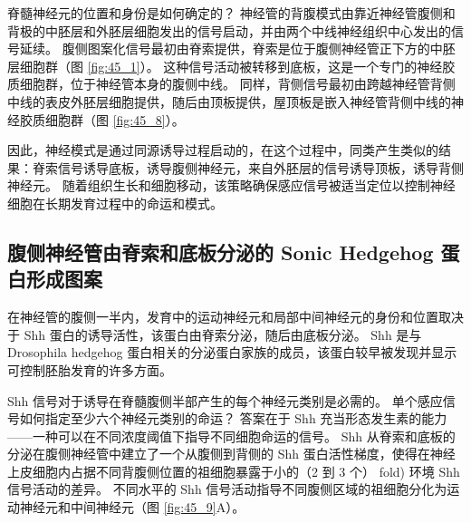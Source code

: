 脊髓神经元的位置和身份是如何确定的？ 神经管的背腹模式由靠近神经管腹侧和背极的中胚层和外胚层细胞发出的信号启动，并由两个中线神经组织中心发出的信号延续。 腹侧图案化信号最初由脊索提供，脊索是位于腹侧神经管正下方的中胚层细胞群（图 \ref{fig:45_1}）。 这种信号活动被转移到底板，这是一个专门的神经胶质细胞群，位于神经管本身的腹侧中线。 同样，背侧信号最初由跨越神经管背侧中线的表皮外胚层细胞提供，随后由顶板提供，屋顶板是嵌入神经管背侧中线的神经胶质细胞群（图 \ref{fig:45_8}）。

因此，神经模式是通过同源诱导过程启动的，在这个过程中，同类产生类似的结果：脊索信号诱导底板，诱导腹侧神经元，来自外胚层的信号诱导顶板，诱导背侧神经元。 随着组织生长和细胞移动，该策略确保感应信号被适当定位以控制神经细胞在长期发育过程中的命运和模式。

\subsection{腹侧神经管由脊索和底板分泌的 Sonic Hedgehog 蛋白形成图案}
在神经管的腹侧一半内，发育中的运动神经元和局部中间神经元的身份和位置取决于 Shh 蛋白的诱导活性，该蛋白由脊索分泌，随后由底板分泌。 Shh 是与 Drosophila hedgehog 蛋白相关的分泌蛋白家族的成员，该蛋白较早被发现并显示可控制胚胎发育的许多方面。

Shh 信号对于诱导在脊髓腹侧半部产生的每个神经元类别是必需的。 单个感应信号如何指定至少六个神经元类别的命运？ 答案在于 Shh 充当形态发生素的能力——一种可以在不同浓度阈值下指导不同细胞命运的信号。 Shh 从脊索和底板的分泌在腹侧神经管中建立了一个从腹侧到背侧的 Shh 蛋白活性梯度，使得在神经上皮细胞内占据不同背腹侧位置的祖细胞暴露于小的（2 到 3 个） fold) 环境 Shh 信号活动的差异。 
不同水平的 Shh 信号活动指导不同腹侧区域的祖细胞分化为运动神经元和中间神经元（图 \ref{fig:45_9}A）。

